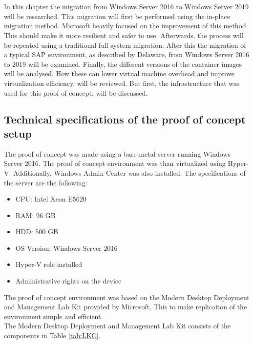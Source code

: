 \chapter{}
\label{ch:methodologie}

In this chapter the migration from Windows Server 2016 to Windows Server 2019 will be researched. This migration will first be performed using the in-place migration method. Microsoft heavily focused on the improvement of this method. This should make it more resilient and safer to use. Afterwards, the process will be repeated using a traditional full system migration. After this the migration of a typical SAP environment, as described by Delaware, from Windows Server 2016 to 2019 will be examined. Finally, the different versions of the container images will be analysed. How these can lower virtual machine overhead and improve virtualization efficiency, will be reviewed. But first, the infrastructure that was used for this proof of concept, will be discussed.

\section{Technical specifications of the proof of concept setup}
The proof of concept was made using a bare-metal server running Windows Server 2016. The proof of concept environment was than virtualized using Hyper-V. 
Additionally, Windows Admin Center was also installed. The specifications of the server are the following:

\begin{itemize}
	\item CPU: Intel Xeon E5620
	\item RAM: 96 GB 
	\item HDD: 500 GB
	\item OS Version: Windows Server 2016
	\item Hyper-V role installed
	\item Administrative rights on the device
\end{itemize}

The proof of concept environment was based on the Modern Desktop Deployment and Management Lab Kit provided by Microsoft. \autocite{Gallagher2018}
This to make replication of the environment simple and efficient.
\\
The Modern Desktop Deployment and Management Lab Kit consists of the components in Table \ref{tab:LKC}.
\\

